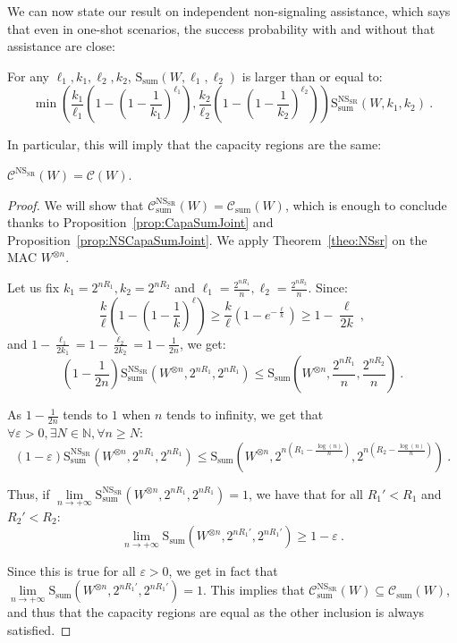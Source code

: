 We can now state our result on independent non-signaling assistance, which says that even in one-shot scenarios, the success probability with and without that assistance are close:

\begin{theorem}
  \label{theo:NSsr}
  For any $\ell_1,k_1,\ell_2,k_2$, $\mathrm{S}_{\text{sum}}(W,\ell_1,\ell_2)$ is larger than or equal to:
  \[ \min\left(\frac{k_1}{\ell_1}\left(1-\left(1-\frac{1}{k_1}\right)^{\ell_1}\right),\frac{k_2}{\ell_2}\left(1-\left(1-\frac{1}{k_2}\right)^{\ell_2}\right)\right)\mathrm{S}_{\text{sum}}^{\mathrm{NS}_{\mathrm{SR}}}(W,k_1,k_2)\ . \]
\end{theorem}

In particular, this will imply that the capacity regions are the same:

\begin{corollary}
  \label{cor:NSsr}
  $\mathcal{C}^{\mathrm{NS}_{\mathrm{SR}}}(W)=\mathcal{C}(W)$.
\end{corollary}
\begin{proof}
  We will show that $\mathcal{C}_{\text{sum}}^{\mathrm{NS}_{\mathrm{SR}}}(W)=\mathcal{C}_{\text{sum}}(W)$, which is enough to conclude thanks to Proposition~\ref{prop:CapaSumJoint} and Proposition~\ref{prop:NSCapaSumJoint}. We apply Theorem~\ref{theo:NSsr} on the MAC $W^{\otimes n}$.

  Let us fix $k_1=2^{nR_1},k_2=2^{nR_2}$ and $\ell_1=\frac{2^{nR_1}}{n},\ell_2=\frac{2^{nR_2}}{n}$. Since:
  \[ \frac{k}{\ell}\left(1-\left(1-\frac{1}{k}\right)^{\ell}\right) \geq \frac{k}{\ell}\left(1-e^{-\frac{\ell}{k}}\right) \geq 1 - \frac{\ell}{2k} \ ,\]
  and $1 - \frac{\ell_1}{2k_1} = 1 - \frac{\ell_2}{2k_2} = 1 - \frac{1}{2n}$, we get:
\[ \left(1-\frac{1}{2n}\right)\mathrm{S}_{\text{sum}}^{\mathrm{NS}_{\mathrm{SR}}}(W^{\otimes n},2^{nR_1},2^{nR_1}) \leq \mathrm{S}_{\text{sum}}\left(W^{\otimes n},\frac{2^{nR_1}}{n},\frac{2^{nR_2}}{n}\right)\ . \]

  As $1-\frac{1}{2n}$ tends to $1$ when $n$ tends to infinity, we get that $\forall \varepsilon > 0, \exists N \in \mathbb{N}, \forall n\geq N$:
  \[(1-\varepsilon)\mathrm{S}_{\text{sum}}^{\mathrm{NS}_{\mathrm{SR}}}(W^{\otimes n},2^{nR_1},2^{nR_1}) \leq \mathrm{S}_{\text{sum}}(W^{\otimes n},2^{n(R_1-\frac{\log(n)}{n})},2^{n(R_2-\frac{\log(n)}{n})}) \ . \]

Thus, if $\underset{n \rightarrow +\infty}{\lim} \mathrm{S}_{\text{sum}}^{\mathrm{NS}_{\mathrm{SR}}}(W^{\otimes n},2^{nR_1},2^{nR_1})  = 1$, we have that for all $R_1'<R_1$ and $R_2'<R_2$:
\[ \underset{n \rightarrow +\infty}{\lim} \mathrm{S}_{\text{sum}}(W^{\otimes n},2^{nR_1'},2^{nR_1'}) \geq 1-\varepsilon \ . \]

Since this is true for all $\varepsilon > 0$, we get in fact that $\underset{n \rightarrow +\infty}{\lim} \mathrm{S}_{\text{sum}}(W^{\otimes n},2^{nR_1'},2^{nR_1'}) = 1$. This implies that $\mathcal{C}_{\text{sum}}^{\mathrm{NS}_{\mathrm{SR}}}(W) \subseteq \mathcal{C}_{\text{sum}}(W)$, and thus that the capacity regions are equal as the other inclusion is always satisfied.
\end{proof}


